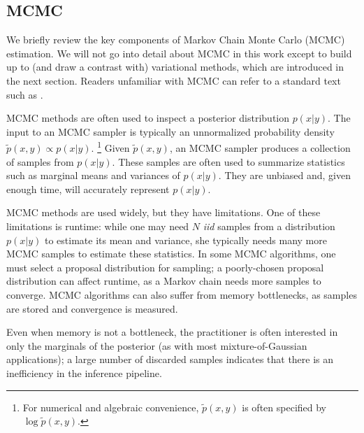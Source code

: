 \subsection{MCMC}


We briefly review the key components of Markov Chain Monte Carlo
(MCMC) estimation.  We will not go into detail about MCMC in this work
except to build up to (and draw a contrast with) variational methods,
which are introduced in the next section. Readers unfamiliar with MCMC
can refer to a standard text such as \cite{bishop:2006}.


MCMC methods are often used to inspect a posterior distribution $p(x |
y)$.  The input to an MCMC sampler is typically an unnormalized
probability density $\tilde p(x, y) \propto p(x | y)$. \footnote{For
  numerical and algebraic convenience, $\tilde p(x, y)$ is often
  specified by $\log \tilde p(x, y)$.}  Given $\tilde p(x, y)$, an
MCMC sampler produces a collection of samples from $p(x | y)$.  These
samples are often used to summarize statistics such as marginal means
and variances of $p(x | y)$.  They are unbiased and, given enough
time, will accurately represent $p(x | y)$.

MCMC methods are used widely, but they have limitations.  One of these
limitations is runtime: while one may need $N$ \emph{iid} samples from
a distribution $p(x | y)$ to estimate its mean and variance, she
typically needs many more MCMC samples to estimate these statistics.
In some MCMC algorithms, one must select a proposal distribution for
sampling; a poorly-chosen proposal distribution can affect runtime, as
a Markov chain needs more samples to converge. MCMC algorithms can
also suffer from memory bottlenecks, as samples are stored and
convergence is measured.

Even when memory is not a bottleneck, the practitioner is often
interested in only the marginals of the posterior (as with most
mixture-of-Gaussian applications); a large number of discarded samples
indicates that there is an inefficiency in the inference pipeline.

